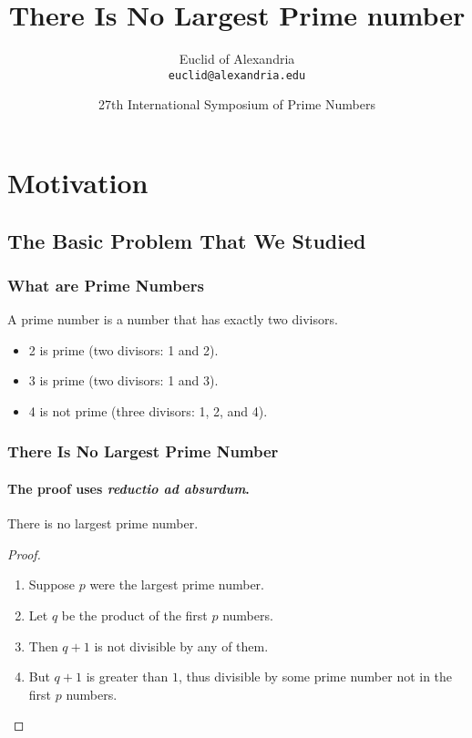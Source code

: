 \documentclass{beamer}
\title{There Is No Largest Prime number}
\author[Euclid]{Euclid of Alexandria \\ \texttt{euclid@alexandria.edu}}
\institute{University of Alexandria}
\date[ISPN '80]{27th International Symposium of Prime Numbers}
\begin{document}
\begin{frame}
  \titlepage
\end{frame}


\section{Motivation}
\subsection{The Basic Problem That We Studied}

\begin{frame}
  \frametitle{What are Prime Numbers}
  \begin{definition}
    A \alert{prime number} is a number that has exactly two divisors.
  \end{definition}
  \pause
  \begin{example}
    \begin{itemize}
      \item<2-> 2 is prime (two divisors: 1 and 2).

      \item<3-> 3 is prime (two divisors: 1 and 3).

      \item<4-> 4 is not prime (\alert{three} divisors: 1, 2, and 4).
    \end{itemize}
  \end{example}
\end{frame}

\begin{frame}
  \frametitle{There Is No Largest Prime Number}
  \framesubtitle{The proof uses \textit{reductio ad absurdum}.}
  \begin{theorem}
    There is no largest prime number.
  \end{theorem}
  \begin{proof}
    \begin{enumerate}
      \item<1-> Suppose $p$ were the largest prime number.

      \item<2-> Let $q$ be the product of the first $p$ numbers.

      \item<3-> Then $q + 1$ is not divisible by any of them.

      \item<1-> But $q + 1$ is greater than $1$, thus divisible by some prime
            number not in the first $p$ numbers.\qedhere
    \end{enumerate}
  \end{proof}
\end{frame}
\end{document}
